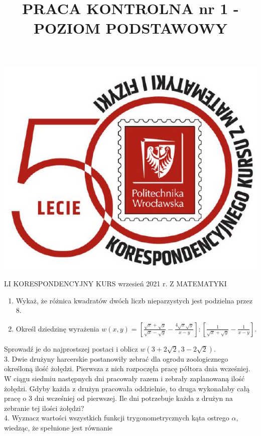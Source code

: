 \documentclass[10pt]{article}
\title{PRACA KONTROLNA nr 1 - POZIOM PODSTAWOWY }
\author{}
\date{}
\begin{document}
\maketitle
\begin{center}
\includegraphics[max width=\textwidth]{2024_11_16_56634e358f067bbe906fg-1}
\end{center}

LI KORESPONDENCYJNY KURS wrzesień 2021 r. Z MATEMATYKI

\begin{enumerate}
  \item Wykaż, że różnica kwadratów dwóch liczb nieparzystych jest podzielna przez 8.
  \item Określ dziedzinę wyrażenia $w(x, y)=\left[\frac{\sqrt{x}+\sqrt{y}}{\sqrt{x}-\sqrt{y}}-\frac{4 \sqrt{x} \sqrt{y}}{x-y}\right]:\left[\frac{1}{\sqrt{x}+\sqrt{y}}-\frac{1}{x-y}\right]$.
\end{enumerate}

Sprowadź je do najprostszej postaci i oblicz $w(3+2 \sqrt{2}, 3-2 \sqrt{2})$.\\
3. Dwie drużyny harcerskie postanowiły zebrać dla ogrodu zoologicznego określoną ilość żołędzi. Pierwsza z nich rozpoczęła pracę półtora dnia wcześniej. W ciągu siedmiu następnych dni pracowały razem i zebrały zaplanowaną ilość żołędzi. Gdyby każda z drużyn pracowała oddzielnie, to druga wykonałaby całą pracę o 3 dni wcześniej od pierwszej. Ile dni potrzebuje każda z drużyn na zebranie tej ilości żołędzi?\\
4. Wyznacz wartości wszystkich funkcji trygonometrycznych kąta ostrego $\alpha$, wiedząc, że spełnione jest równanie
\end{document}
